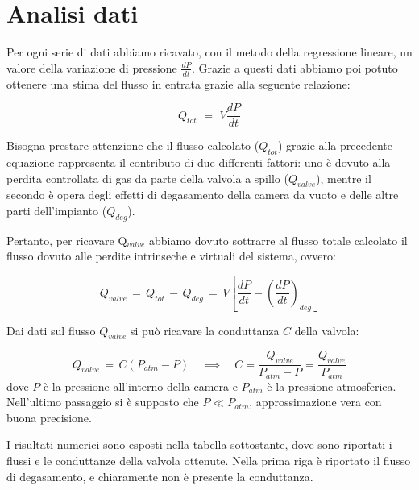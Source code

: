 \section{Analisi dati}

Per ogni serie di dati abbiamo ricavato, con il metodo della regressione lineare, un valore della variazione di pressione $\frac{dP}{dt}$. Grazie a questi dati abbiamo poi potuto ottenere una stima del flusso in entrata grazie alla seguente relazione:

\begin{equation}
	Q_{tot} \,\, = \,\, V \frac{dP}{dt}
\end{equation}

Bisogna prestare attenzione che il flusso calcolato ($Q_{tot}$) grazie alla precedente equazione rappresenta il contributo di due differenti fattori: uno è dovuto alla perdita controllata di gas da parte della valvola a spillo ($Q_{valve}$), mentre il secondo è opera degli effetti di degasamento della camera da vuoto e delle altre parti dell'impianto ($Q_{deg}$).

Pertanto, per ricavare Q$_{valve}$ abbiamo dovuto sottrarre al flusso totale calcolato il flusso  dovuto alle perdite intrinseche e virtuali del sistema, ovvero:

\begin{equation}
	Q_{valve} \, = \, Q_{tot} \, - \, Q_{deg} \, = \, V \left[ \frac{dP}{dt} - \left(\frac{dP}{dt}\right)_{deg} \right]
\end{equation}

Dai dati sul flusso $Q_{valve}$ si può ricavare la conduttanza $C$ della valvola:

\begin{equation}
	Q_{valve} \, = \, C (P_{atm} - P) \quad \implies \quad C = \frac{Q_{valve}}{P_{atm} - P} = \frac{Q_{valve}}{P_{atm}}
\end{equation}
%
dove $P$ è la pressione all'interno della camera e $P_{atm}$ è la pressione atmosferica. Nell'ultimo passaggio si è supposto
che $P \ll P_{atm}$, approssimazione vera con buona precisione.

I risultati numerici sono esposti nella tabella sottostante, dove sono riportati i flussi e le conduttanze della valvola ottenute.
Nella prima riga è riportato il flusso di degasamento, e chiaramente non è presente la conduttanza.




